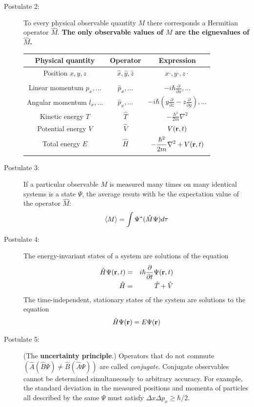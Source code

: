 \documentclass[11pt]{article}
\begin{document}
\begin{table}
\begin{center}
\begin{description}
  \item[Postulate 2:]  To every physical observable quantity $M$ there corresponds a
    Hermitian operator $\hat{M}$.  {\bf The only observable values of $M$ are the
      eignevalues of $\hat{M}$.}
    \begin{center}
    \begin{tabular}[H]{ccc}
      \hline
{\bf Physical quantity} & {\bf Operator} & {\bf Expression} \\
\hline
Position $x,y,z$ & $\hat{x},\hat{y},\hat{z}$ & $x\cdot, y\cdot, z\cdot$ \\ \\
Linear momentum $p_x, \ldots$ & $\hat{p}_x,\ldots $ & $\displaystyle -i\hbar\frac{\partial}{\partial
  x},\ldots $\\
Angular momentum $l_x, \ldots$ & $\hat{p}_x,\ldots $ & $\displaystyle -i\hbar \left
  (y\frac{\partial}{\partial z}-z\frac{\partial}{\partial y}\right ), \ldots $ \\
Kinetic energy $T$ & $\hat{T}$ & $\displaystyle -\frac{\hbar^2}{2m}\nabla^2$ \\
Potential energy $V$ & $\hat{V}$ & $V({\bf r},t)$ \\
Total energy $E$ & $\hat{H}$ & $\displaystyle -\frac{\hbar^2}{2m}\nabla^2+V({\bf r},t)$\\ \\
\hline
    \end{tabular}
  \end{center}
    \item[Postulate 3:] {If a particular observable $M$ is measured many times on many
      identical systems is a state $\Psi$, the average resuts with be the expectation
      value of the operator $\hat{M}$:
      \begin{equation*}
        \langle M \rangle = \int \Psi^* (\hat{M}\Psi)d{\bf\tau}
      \end{equation*}}
    \item[Postulate 4:] {The energy-invariant states of a system are solutions of the equation
        \begin{eqnarray*}
          \hat{H}\Psi({\bf r},t) & = & i\hbar\frac{\partial}{\partial t}\Psi({\bf r},t) \\
          \hat{H} & = & \hat{T}+\hat{V}
        \end{eqnarray*}
      The time-independent, stationary states of the system are solutions to the equation
      \begin{equation*}
        \hat{H}\Psi({\bf r}) = E\Psi(\bf{r})
      \end{equation*}
}
    \item[Postulate 5:] (The {\bf uncertainty principle}.)  Operators that do not commute
      $(\hat{A}(\hat{B}\Psi)\neq\hat{B}(\hat{A}\Psi))$ are called {\em conjugate}.
      Conjugate observables cannot be determined simultaneously to arbitrary accuracy.
      For example, the standard deviation in the measured positions and momenta of
      particles all described by the same $\Psi$ must satisfy $\Delta x\Delta p_x \geq \hbar/2$.
    \end{description}
\end{center}
\end{table}
\end{document}
